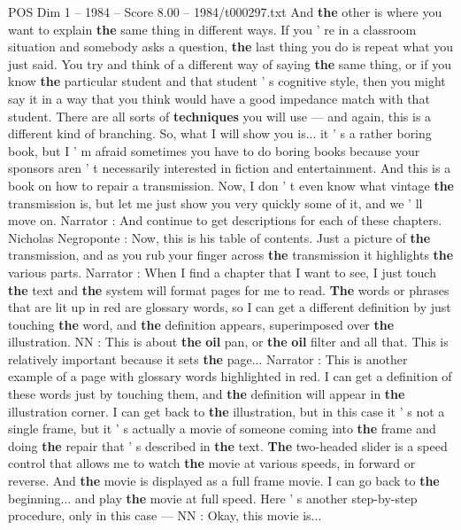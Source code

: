 \begin{textsample}{POS Dim 1 – 1984 – Score 8.00 – 1984/t000297.txt}
And \textbf{the} other is where you want to explain \textbf{the} same thing in different ways.
If you ' re in a classroom situation and somebody asks a question, \textbf{the} last thing you do is repeat what you just said.
You try and think of a different way of saying \textbf{the} same thing, or if you know \textbf{the} particular student and that student ' s cognitive style, then you might say it in a way that you think would have a good impedance match with that student.
There are all sorts of \textbf{techniques} you will use — and again, this is a different kind of branching.
So, what I will show you is... it ' s a rather boring book, but I ' m afraid sometimes you have to do boring books because your sponsors aren ' t necessarily interested in fiction and entertainment.
And this is a book on how to repair a transmission.
Now, I don ' t even know what vintage \textbf{the} transmission is, but let me just show you very quickly some of it, and we ' ll move on.
Narrator : And continue to get descriptions for each of these chapters.
Nicholas Negroponte : Now, this is his table of contents.
Just a picture of \textbf{the} transmission, and as you rub your finger across \textbf{the} transmission it highlights \textbf{the} various parts.
Narrator : When I find a chapter that I want to see, I just touch \textbf{the} text and \textbf{the} system will format pages for me to read. \textbf{The} words or phrases that are lit up in red are glossary words, so I can get a different definition by just touching \textbf{the} word, and \textbf{the} definition appears, superimposed over \textbf{the} illustration.
NN : This is about \textbf{the} \textbf{oil} pan, or \textbf{the} \textbf{oil} filter and all that.
This is relatively important because it sets \textbf{the} page...
Narrator : This is another example of a page with glossary words highlighted in red.
I can get a definition of these words just by touching them, and \textbf{the} definition will appear in \textbf{the} illustration corner.
I can get back to \textbf{the} illustration, but in this case it ' s not a single frame, but it ' s actually a movie of someone coming into \textbf{the} frame and doing \textbf{the} repair that ' s described in \textbf{the} text. \textbf{The} two-headed slider is a speed control that allows me to watch \textbf{the} movie at various speeds, in forward or reverse.
And \textbf{the} movie is displayed as a full frame movie.
I can go back to \textbf{the} beginning... and play \textbf{the} movie at full speed.
Here ' s another step-by-step procedure, only in this case — NN : Okay, this movie is...

\end{textsample}
